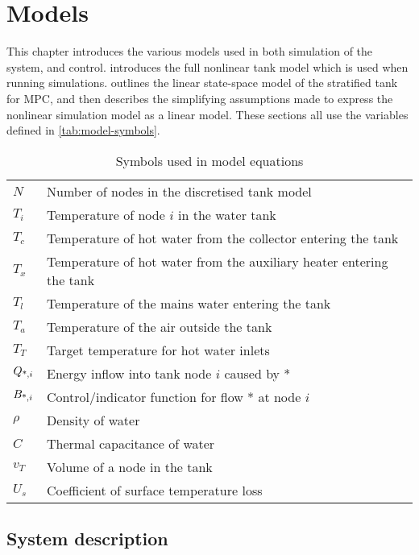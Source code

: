 \chapter{Models}
\label{ch:models}

This chapter introduces the various models used in both simulation of the system, and control.
 introduces the full nonlinear tank model which is used when running simulations.
 outlines the linear state-space model of the stratified tank for MPC, and then describes the simplifying assumptions made to express the nonlinear simulation model as a linear model.
These sections all use the variables defined in \autoref{tab:model-symbols}.

\begin{table}
   \caption{Symbols used in model equations}
   \label{tab:model-symbols}
   \begin{center}
   \begin{tabular}{l l}
      \toprule
      $N$ & Number of nodes in the discretised tank model \\
      $T_i$ & Temperature of node $i$ in the water tank \\
      $T_c$ & Temperature of hot water from the collector entering the tank \\
      $T_x$ & Temperature of hot water from the auxiliary heater entering the tank \\
      $T_l$ & Temperature of the mains water entering the tank \\
      $T_a$ & Temperature of the air outside the tank \\
      $T_T$ & Target temperature for hot water inlets \\
      $Q_{\text{*}, i}$ & Energy inflow into tank node $i$ caused by * \\
      $B_{\text{*}, i}$ & Control/indicator function for flow * at node $i$ \\
		$\rho$ & Density of water \\
      $C$ & Thermal capacitance of water \\
      $v_T$ & Volume of a node in the tank \\
      $U_s$ & Coefficient of surface temperature loss \\
      \bottomrule
   \end{tabular}
   \end{center}
\end{table}

\section{System description}
\label{sec:model:system}

